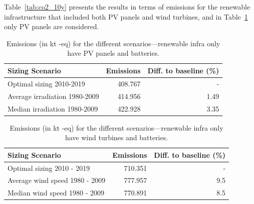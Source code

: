 Table~\ref{tab:co2_10y} presents the results in terms of  emissions for the renewable infrastructure that included both PV panels and wind turbines, and in Table~\ref{tab:co2_10y_pv_only} only PV panels are considered.



 \begin{table}[H]   
  \caption{Emissions (in kt -eq) for the different scenarios---renewable infra only have PV panels and batteries.} \centering

   \label{tab:co2_10y_pv_only}
  
      \begin{tabular}{|l|r|r|}        
        \hline
        \textbf{Sizing Scenario} &  \textbf{Emissions } & \textbf{Diff. to baseline (\%) } \\
       \hline        
        Optimal sizing 2010-2019       &       408.767 &  -       \\
        \hline     
        Average irradiation 1980-2009  &       414.956 &  1.49    \\
        \hline
        Median irradiation  1980-2009  &       422.928 &  3.35   \\
        \hline        
      \end{tabular}
      
    \end{table}


    
 \begin{table}[H]   
  \caption{Emissions (in kt -eq) for the different scenarios---renewable infra only have wind turbines and batteries.} \centering

   \label{tab:co2_10y_wt_only}
  
      \begin{tabular}{|l|r|r|}        
        \hline
        \textbf{Sizing Scenario} &  \textbf{Emissions } & \textbf{Diff. to baseline (\%) } \\
        
        \hline
        Optimal sizing 2010 - 2019       &       710.351 &  -        \\
        \hline     
        Average wind speed 1980 - 2009  &       777.957 &  9.5      \\
        \hline 
        Median wind speed  1980 - 2009  &       770.891 &  8.5      \\
        \hline        
      \end{tabular}      
    \end{table}

